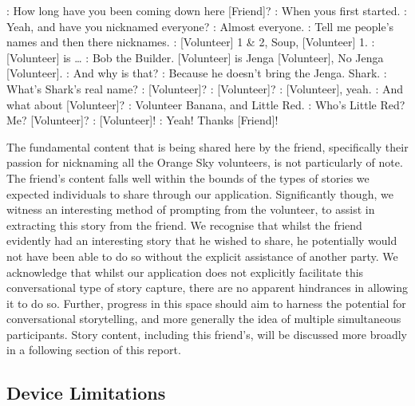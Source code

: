 \begin{drama}

    \volspeaks: How long have you been coming down here [Friend]?
    \friendspeaks: When yous first started.
    \volspeaks: Yeah, and have you nicknamed everyone?
    \friendspeaks: Almost everyone.
    \volspeaks: Tell me people's names and then there nicknames.
    \friendspeaks: [Volunteer] 1 \& 2, Soup, [Volunteer] 1.
    \volspeaks: [Volunteer] is \dots
    \friendspeaks: Bob the Builder. [Volunteer] is Jenga [Volunteer], No Jenga [Volunteer].
    \volspeaks: And why is that?
    \friendspeaks: Because he doesn't bring the Jenga. Shark.
    \volspeaks: What's Shark's real name?
    \friendspeaks: [Volunteer]?
    \volspeaks: [Volunteer]?
    \friendspeaks: [Volunteer], yeah.
    \volspeaks: And what about [Volunteer]?
    \friendspeaks: {Volunteer} Banana, and Little Red.
    \volspeaks: Who's Little Red? Me? [Volunteer]?
    \friendspeaks: [Volunteer]!
    \volspeaks: Yeah! Thanks [Friend]!
\end{drama}

The fundamental content that is being shared here by the friend, specifically their passion for nicknaming all the Orange Sky volunteers, is not particularly of note. The friend's content falls well within the bounds of the types of stories we expected individuals to share through our application. Significantly though, we witness an interesting method of prompting from the volunteer, to assist in extracting this story from the friend. We recognise that whilst the friend evidently had an interesting story that he wished to share, he potentially would not have been able to do so without the explicit assistance of another party. We acknowledge that whilst our application does not explicitly facilitate this conversational type of story capture, there are no apparent hindrances in allowing it to do so. Further, progress in this space should aim to harness the potential for conversational storytelling, and more generally the idea of multiple simultaneous participants. Story content, including this friend's, will be discussed more broadly in a following section of this report.

\subsection{Device Limitations}

